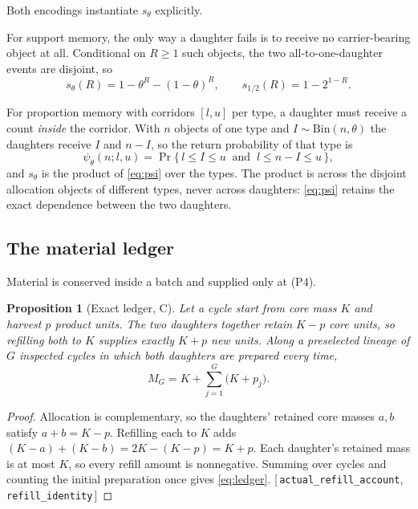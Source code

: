 \documentclass[11pt]{article}
\theoremstyle{plain}
\newtheorem{proposition}[theorem]{Proposition}
\theoremstyle{definition}
\theoremstyle{remark}
\newcommand{\Bin}{\mathrm{Bin}}
\newcommand{\leanref}[1]{{\normalfont\sffamily\footnotesize[\,#1\,]}}
\begin{document}
Both encodings instantiate $s_\theta$ explicitly.

For support memory, the only way a daughter fails is to receive no
carrier-bearing object at all. Conditional on $R\ge1$ such objects, the two
all-to-one-daughter events are disjoint, so
\begin{equation}\label{eq:sfair}
s_\theta(R)=1-\theta^{R}-(1-\theta)^{R},
\qquad s_{1/2}(R)=1-2^{1-R}.
\end{equation}

For proportion memory with corridors $[l,u]$ per type, a daughter must receive
a count \emph{inside} the corridor. With $n$ objects of one type and
$I\sim\Bin(n,\theta)$ the daughters receive $I$ and $n-I$, so the return
probability of that type is
\begin{equation}\label{eq:psi}
\psi_\theta(n;l,u)=\Pr\{\,l\le I\le u\ \text{ and }\ l\le n-I\le u\,\},
\end{equation}
and $s_\theta$ is the product of \eqref{eq:psi} over the types. The product is
across the disjoint allocation objects of different types, never across
daughters: \eqref{eq:psi} retains the exact dependence between the two
daughters.

\subsection{The material ledger}

Material is conserved inside a batch and supplied only at (P4).

\begin{proposition}[Exact ledger, C]\label{prop:ledger}
Let a cycle start from core mass $K$ and harvest $p$ product units. The two
daughters together retain $K-p$ core units, so refilling both to $K$ supplies
exactly $K+p$ new units. Along a preselected lineage of $G$ inspected cycles
in which both daughters are prepared every time,
\begin{equation}\label{eq:ledger}
M_G=K+\sum_{j=1}^{G}\bigl(K+p_j\bigr).
\end{equation}
\end{proposition}

\begin{proof}
Allocation is complementary, so the daughters' retained core masses $a,b$
satisfy $a+b=K-p$. Refilling each to $K$ adds $(K-a)+(K-b)=2K-(K-p)=K+p$.
Each daughter's retained mass is at most $K$, so every refill amount is
nonnegative. Summing over cycles and counting the initial preparation once
gives \eqref{eq:ledger}. \leanref{\texttt{actual\_refill\_account},
\texttt{refill\_identity}}
\end{proof}
\end{document}
